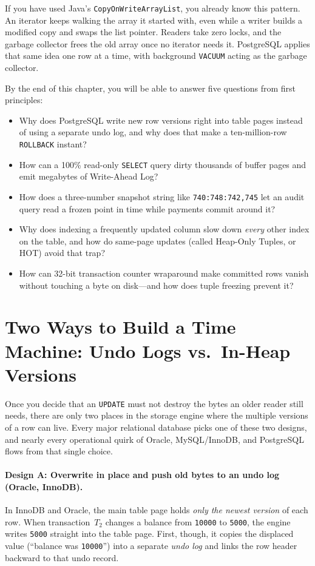 If you have used Java's \texttt{CopyOnWriteArrayList}, you already know this pattern. An iterator keeps walking the array it started with, even while a writer builds a modified copy and swaps the list pointer. Readers take zero locks, and the garbage collector frees the old array once no iterator needs it. PostgreSQL applies that same idea one row at a time, with background \texttt{VACUUM} acting as the garbage collector.

\begin{focusbox}
By the end of this chapter, you will be able to answer five questions from first principles:
\begin{itemize}
  \item Why does PostgreSQL write new row versions right into table pages instead of using a separate undo log, and why does that make a ten-million-row \texttt{ROLLBACK} instant?
  \item How can a 100\% read-only \texttt{SELECT} query dirty thousands of buffer pages and emit megabytes of Write-Ahead Log?
  \item How does a three-number snapshot string like \texttt{740:748:742,745} let an audit query read a frozen point in time while payments commit around it?
  \item Why does indexing a frequently updated column slow down \emph{every} other index on the table, and how do same-page updates (called Heap-Only Tuples, or HOT) avoid that trap?
  \item How can 32-bit transaction counter wraparound make committed rows vanish without touching a byte on disk---and how does tuple freezing prevent it?
\end{itemize}
\end{focusbox}

\chapterline

\section{Two Ways to Build a Time Machine: Undo Logs vs.\ In-Heap Versions}
\label{ch05:undo-vs-heap}

Once you decide that an \texttt{UPDATE} must not destroy the bytes an older reader still needs, there are only two places in the storage engine where the multiple versions of a row can live. Every major relational database picks one of these two designs, and nearly every operational quirk of Oracle, MySQL/InnoDB, and PostgreSQL flows from that single choice.

\paragraph{Design A: Overwrite in place and push old bytes to an undo log (Oracle, InnoDB).}
In InnoDB and Oracle, the main table page holds \emph{only the newest version} of each row. When transaction~$T_2$ changes a balance from \texttt{10000} to \texttt{5000}, the engine writes \texttt{5000} straight into the table page. First, though, it copies the displaced value (``balance was \texttt{10000}'') into a separate \emph{undo log} and links the row header backward to that undo record.

